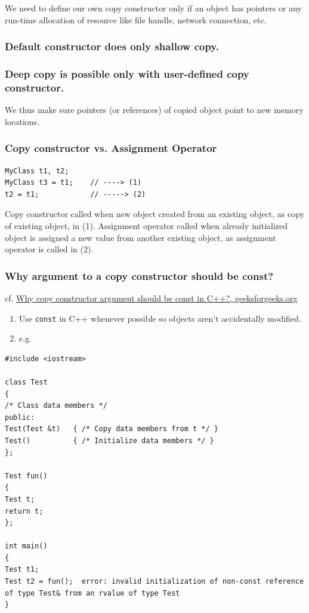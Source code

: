\documentclass[10pt]{amsart}
\begin{document}
We need to define our own copy constructor only if an object has pointers or any run-time allocation of resource like file handle, network connection, etc.  

\subsubsection{Default constructor does only shallow copy.}  

\subsubsection{Deep copy is possible only with user-defined copy constructor.}  

We thus make sure pointers (or references) of copied object point to new memory locations.  

\subsubsection{Copy constructor vs. Assignment Operator}  

\begin{lstlisting}  
MyClass t1, t2; 
MyClass t3 = t1; 	// ----> (1)
t2 = t1; 			// -----> (2)
\end{lstlisting}

Copy constructor called when new object created from an existing object, as copy of existing object, in (1).  
Assignment operator called when already initialized object is assigned a new value from another existing object, as assignment operator is called in (2).  

\subsubsection{Why argument to a copy constructor should be const?  } 

cf. \href{http://www.geeksforgeeks.org/copy-constructor-argument-const/}{Why copy constructor argument should be const in C++?, geeksforgeeks.org}

\begin{enumerate}
	\item Use \verb|const| in C++ whenever possible so objects aren't accidentally modified.  
	\item e.g.  
\end{enumerate}

\begin{lstlisting}  
#include <iostream>  

class Test
{
/* Class data members */
public:
Test(Test &t) 	{ /* Copy data members from t */ } 
Test()			{ /* Initialize data members */ }
};

Test fun() 
{
Test t;
return t;
};

int main()
{
Test t1;
Test t2 = fun();  error: invalid initialization of non-const reference of type Test& from an rvalue of type Test
}
\end{lstlisting}
\end{document}
